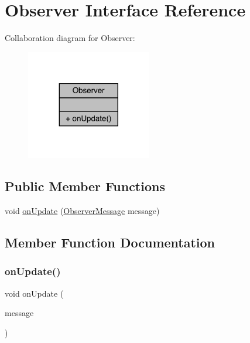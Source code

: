 \hypertarget{interfacecom_1_1toast_1_1android_1_1gamebase_1_1observer_1_1_observer}{}\section{Observer Interface Reference}
\label{interfacecom_1_1toast_1_1android_1_1gamebase_1_1observer_1_1_observer}


Collaboration diagram for Observer\+:
\nopagebreak
\begin{figure}[H]
\begin{center}
\leavevmode
\includegraphics[width=155pt]{interfacecom_1_1toast_1_1android_1_1gamebase_1_1observer_1_1_observer__coll__graph}
\end{center}
\end{figure}
\subsection*{Public Member Functions}
\begin{DoxyCompactItemize}
\item 
void \hyperlink{interfacecom_1_1toast_1_1android_1_1gamebase_1_1observer_1_1_observer_af378cfb05f1463948df9ed0c682ac910}{on\+Update} (\hyperlink{classcom_1_1toast_1_1android_1_1gamebase_1_1observer_1_1_observer_message}{Observer\+Message} message)
\end{DoxyCompactItemize}


\subsection{Member Function Documentation}
\mbox{\label{interfacecom_1_1toast_1_1android_1_1gamebase_1_1observer_1_1_observer_af378cfb05f1463948df9ed0c682ac910}} 
\subsubsection{\texorpdfstring{on\+Update()}{onUpdate()}}
{\footnotesize\ttfamily void on\+Update (\begin{DoxyParamCaption}\item[{\hyperlink{classcom_1_1toast_1_1android_1_1gamebase_1_1observer_1_1_observer_message}{Observer\+Message}}]{message }\end{DoxyParamCaption})}

